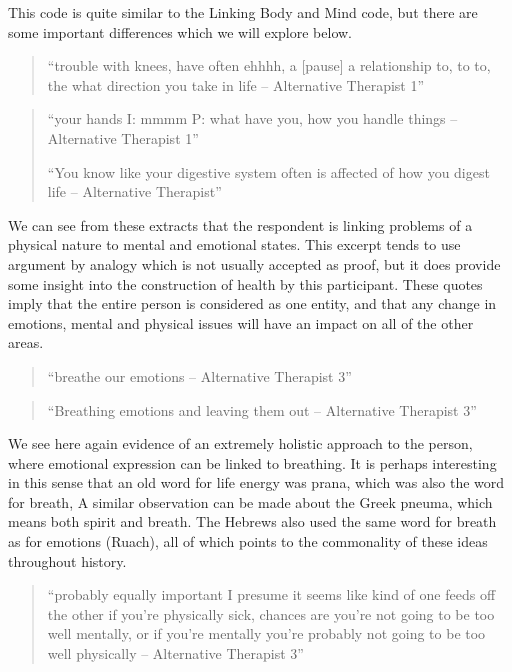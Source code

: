 This code is quite similar to the Linking Body and Mind code, but there are some important differences which we will explore below. 

\begin{quotation}
``trouble with knees, have often ehhhh, a [pause] a relationship to, to to, the what direction you take in life – Alternative Therapist 1''
  
\end{quotation}

\begin{quotation}
``your hands 
I: mmmm
P: what have you, how you handle things – Alternative Therapist 1''

``You know like your digestive system often is affected of how you digest life – Alternative Therapist''  
\end{quotation}



We can see from these extracts that the respondent is linking problems of a physical nature to mental and emotional states. This excerpt tends to use argument by analogy which is not usually accepted as proof, but it does provide some insight into the construction of health by this participant. These quotes imply that the entire person is considered as one entity, and that any change in emotions, mental and physical issues will have an impact on all of the other areas. 

\begin{quotation}
``breathe our emotions – Alternative Therapist 3''  
\end{quotation}


\begin{quotation}
  ``Breathing emotions and leaving them out – Alternative Therapist 3''
\end{quotation}

We see here again evidence of an extremely holistic approach to the person, where emotional expression can be linked to breathing. It is perhaps interesting in this sense that an old word for life energy was prana, which was also the word for breath, A similar observation can be made about the Greek pneuma, which means both spirit and breath. The Hebrews also used the same word for breath as for emotions (Ruach), all of which points to the commonality of these ideas throughout history. 

\begin{quotation}
``probably equally important I presume it seems like kind of one feeds off the other if you're physically sick, chances are you're not going to be too well mentally, or if you're mentally you're probably not going to be too well physically – Alternative Therapist 3''  
\end{quotation}


